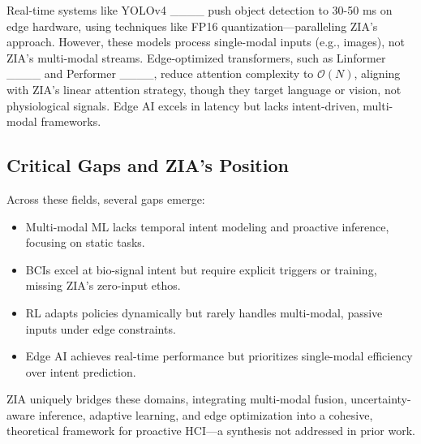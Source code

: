 Real-time systems like YOLOv4 ____ push object detection to 30-50 ms on edge hardware, using techniques like FP16 quantization—paralleling ZIA's approach. However, these models process single-modal inputs (e.g., images), not ZIA's multi-modal streams. Edge-optimized transformers, such as Linformer ____ and Performer ____, reduce attention complexity to \(\mathcal{O}(N)\), aligning with ZIA's linear attention strategy, though they target language or vision, not physiological signals. Edge AI excels in latency but lacks intent-driven, multi-modal frameworks.

\subsection{Critical Gaps and ZIA's Position}
Across these fields, several gaps emerge:
\begin{itemize}
    \item Multi-modal ML lacks temporal intent modeling and proactive inference, focusing on static tasks.
    \item BCIs excel at bio-signal intent but require explicit triggers or training, missing ZIA's zero-input ethos.
    \item RL adapts policies dynamically but rarely handles multi-modal, passive inputs under edge constraints.
    \item Edge AI achieves real-time performance but prioritizes single-modal efficiency over intent prediction.
\end{itemize}

ZIA uniquely bridges these domains, integrating multi-modal fusion, uncertainty-aware inference, adaptive learning, and edge optimization into a cohesive, theoretical framework for proactive HCI—a synthesis not addressed in prior work.